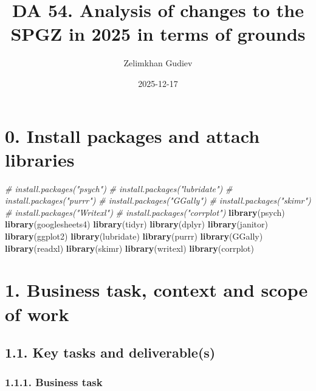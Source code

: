 \documentclass[
]{article}
\title{DA 54. Analysis of changes to the SPGZ in 2025 in terms of
grounds}
\author{Zelimkhan Gudiev}
\date{2025-12-17}
\newenvironment{Shaded}{\begin{snugshade}}{\end{snugshade}}
\newcommand{\CommentTok}[1]{\textcolor[rgb]{0.56,0.35,0.01}{\textit{#1}}}
\newcommand{\FunctionTok}[1]{\textcolor[rgb]{0.13,0.29,0.53}{\textbf{#1}}}
\newcommand{\NormalTok}[1]{#1}
\begin{document}
\maketitle

{
\setcounter{tocdepth}{5}
\tableofcontents
}
\newpage

\section{\texorpdfstring{\textbf{0. Install packages and attach
libraries}}{0. Install packages and attach libraries}}\label{install-packages-and-attach-libraries}

\begin{Shaded}
\begin{Highlighting}[]
\CommentTok{\# install.packages("psych")}
\CommentTok{\# install.packages("lubridate")}
\CommentTok{\# install.packages("purrr")}
\CommentTok{\# install.packages("GGally")}
\CommentTok{\# install.packages("skimr")}
\CommentTok{\# install.packages("Writexl")}
\CommentTok{\# install.packages("corrplot")}
\FunctionTok{library}\NormalTok{(psych)}
\FunctionTok{library}\NormalTok{(googlesheets4)}
\FunctionTok{library}\NormalTok{(tidyr)}
\FunctionTok{library}\NormalTok{(dplyr)}
\FunctionTok{library}\NormalTok{(janitor)}
\FunctionTok{library}\NormalTok{(ggplot2)}
\FunctionTok{library}\NormalTok{(lubridate)}
\FunctionTok{library}\NormalTok{(purrr)}
\FunctionTok{library}\NormalTok{(GGally)}
\FunctionTok{library}\NormalTok{(readxl)}
\FunctionTok{library}\NormalTok{(skimr)}
\FunctionTok{library}\NormalTok{(writexl)}
\FunctionTok{library}\NormalTok{(corrplot)}
\end{Highlighting}
\end{Shaded}

\newpage

\section{\texorpdfstring{\textbf{1. Business task, context and scope of
work}}{1. Business task, context and scope of work}}\label{business-task-context-and-scope-of-work}

\subsection{\texorpdfstring{\textbf{1.1. Key tasks and
deliverable(s)}}{1.1. Key tasks and deliverable(s)}}\label{key-tasks-and-deliverables}

\subsubsection{\texorpdfstring{\textbf{1.1.1. Business
task}}{1.1.1. Business task}}\label{business-task}
\end{document}
